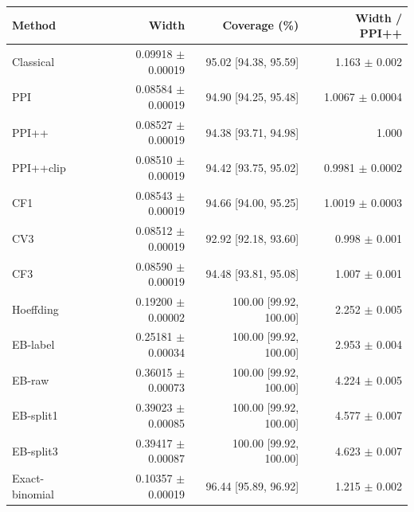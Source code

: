 \small
\begin{tabular}{lrrr}
\toprule
Method & Width & Coverage (\%) & Width / PPI++ \\
\midrule
Classical & 0.09918 $\pm$ 0.00019 & 95.02 [94.38, 95.59] & 1.163 $\pm$ 0.002 \\
PPI & 0.08584 $\pm$ 0.00019 & 94.90 [94.25, 95.48] & 1.0067 $\pm$ 0.0004 \\
PPI++ & 0.08527 $\pm$ 0.00019 & 94.38 [93.71, 94.98] & 1.000 \\
PPI++clip & 0.08510 $\pm$ 0.00019 & 94.42 [93.75, 95.02] & 0.9981 $\pm$ 0.0002 \\
CF1 & 0.08543 $\pm$ 0.00019 & 94.66 [94.00, 95.25] & 1.0019 $\pm$ 0.0003 \\
CV3 & 0.08512 $\pm$ 0.00019 & 92.92 [92.18, 93.60] & 0.998 $\pm$ 0.001 \\
CF3 & 0.08590 $\pm$ 0.00019 & 94.48 [93.81, 95.08] & 1.007 $\pm$ 0.001 \\
Hoeffding & 0.19200 $\pm$ 0.00002 & 100.00 [99.92, 100.00] & 2.252 $\pm$ 0.005 \\
EB-label & 0.25181 $\pm$ 0.00034 & 100.00 [99.92, 100.00] & 2.953 $\pm$ 0.004 \\
EB-raw & 0.36015 $\pm$ 0.00073 & 100.00 [99.92, 100.00] & 4.224 $\pm$ 0.005 \\
EB-split1 & 0.39023 $\pm$ 0.00085 & 100.00 [99.92, 100.00] & 4.577 $\pm$ 0.007 \\
EB-split3 & 0.39417 $\pm$ 0.00087 & 100.00 [99.92, 100.00] & 4.623 $\pm$ 0.007 \\
Exact-binomial & 0.10357 $\pm$ 0.00019 & 96.44 [95.89, 96.92] & 1.215 $\pm$ 0.002 \\
\bottomrule
\end{tabular}
